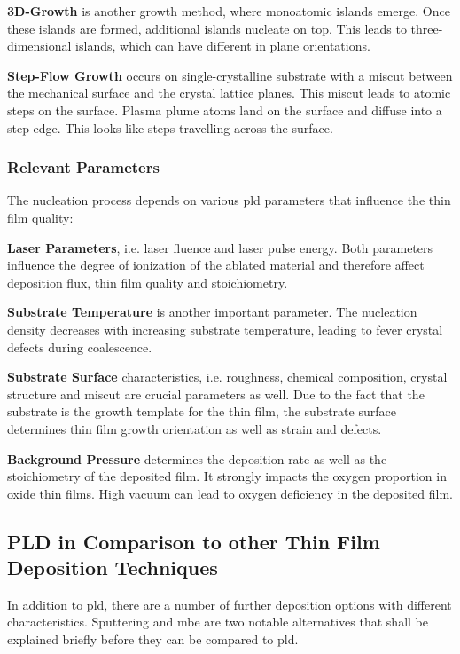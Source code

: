 \textbf{3D-Growth} is another growth method, where monoatomic islands 
emerge. 
Once these islands are formed, additional islands nucleate on top.
This leads to three-dimensional islands, which can have different in plane orientations.  

\textbf{Step-Flow Growth} occurs on single-crystalline substrate with a miscut between
the mechanical surface and the crystal lattice planes.
This miscut leads to atomic steps on the surface.
Plasma plume atoms land on the surface and diffuse into a step edge.
This looks like steps travelling across the surface.

\subsubsection{Relevant Parameters}
The nucleation process depends on various \ac{pld} parameters that influence
the thin film quality:

\textbf{Laser Parameters}, i.e. laser fluence and laser pulse energy.
Both parameters influence the degree of ionization of the ablated material and therefore
affect deposition flux, thin film quality and stoichiometry. 

\textbf{Substrate Temperature} is another important parameter. 
The nucleation density decreases with increasing substrate temperature, leading to 
fever crystal defects during coalescence.

\textbf{Substrate Surface} characteristics, i.e. roughness, chemical composition, 
crystal structure and miscut are crucial parameters as well.
Due to the fact that the substrate is the growth template for the thin film, 
the substrate surface determines thin film growth orientation as well as strain and 
defects.

\textbf{Background Pressure} determines
the deposition rate as well as the stoichiometry of the deposited film.
It strongly impacts the oxygen proportion in oxide thin films.
High vacuum can lead to oxygen deficiency in the deposited film.

\subsection{PLD in Comparison to other Thin Film Deposition Techniques}
In addition to \ac{pld}, there are a number of further deposition options 
with different characteristics. 
Sputtering and \ac{mbe} are two notable alternatives that shall be explained briefly
before they can be compared to \ac{pld}.

